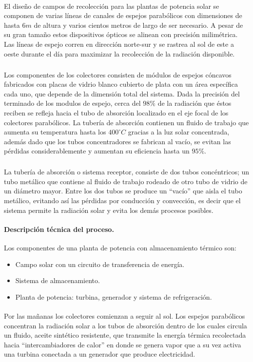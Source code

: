 \documentclass{article}
\theoremstyle{definition} \newtheorem{defi}{Definici\'on}
\theoremstyle{definition} \newtheorem{teo}{Teorema}
\theoremstyle{definition} \newtheorem{cor}{Corolario}
\begin{document}
\paragraph{}
El dise\~no de campos de recolecci\'on para las plantas de potencia solar se componen de varias l\'ineas de canales de espejos parab\'olicos con dimensiones de hasta $6m$ de altura y varios cientos metros de largo de ser necesario. A pesar de su gran tama\~no estos dispositivos \'opticos se alinean con precisi\'on milim\'etrica. Las l\'ineas de espejo corren en direcci\'on norte-sur y se rastrea al sol de este a oeste durante el d\'ia para maximizar la recolecci\'on de la radiaci\'on disponible.
\subparagraph{}
Los componentes de los colectores consisten de m\'odulos de espejos c\'oncavos fabricados con placas de vidrio blanco cubierto de plata con un \'area espec\'ifica cada uno, que depende de la dimensi\'on total del sistema. Dada la precisi\'on del terminado de los modulos de espejo, cerca del $98\%$ de la radiaci\'on que \'estos reciben se refleja hacia el tubo de absorci\'on localizado en el eje focal de los colectores parab\'olicos. La tuber\'ia de absorci\'on contienen un fluido de trabajo que aumenta su temperatura hasta los $400^\circ C$ gracias a la luz solar concentrada, adem\'as dado que los tubos concentradores se fabrican al vac\'io, se evitan las p\'erdidas considerablemente y aumentan su eficiencia hasta un $95\%$.
\subparagraph{}
La tuber\'ia de absorci\'on o sistema receptor, consiste de dos tubos conc\'entricos; un tubo met\'alico que contiene al fluido de trabajo rodeado de otro tubo de vidrio de un di\'ametro mayor. Entre los dos tubos se produce un ``vac\'io'' que aisla el tubo met\'alico, evitando as\'i las p\'erdidas por conducci\'on y convecci\'on, es decir que el sistema permite la radiaci\'on solar y evita los dem\'as procesos posibles.
\paragraph{Descripci\'on t\'ecnica del proceso.}
Los componentes de una planta de potencia con almacenamiento t\'ermico son:
\begin{itemize}
\item Campo solar con un circuito de transferencia de energ\'ia.
\item Sistema de almacenamiento.
\item Planta de potencia: turbina, generador y sistema de refrigeraci\'on.
\end{itemize}
\paragraph{}
Por las ma\~nanas los colectores comienzan a seguir al sol. Los espejos parab\'olicos concentran la radiaci\'on solar a los tubos de absorci\'on dentro de los cuales circula un fluido, aceite sint\'etico resistente, que transmite la energ\'ia t\'ermica recolectada hacia  ``intercambiadores de calor'' en donde se genera vapor que a su vez activa una turbina conectada a un generador que produce electricidad.
\end{document}
